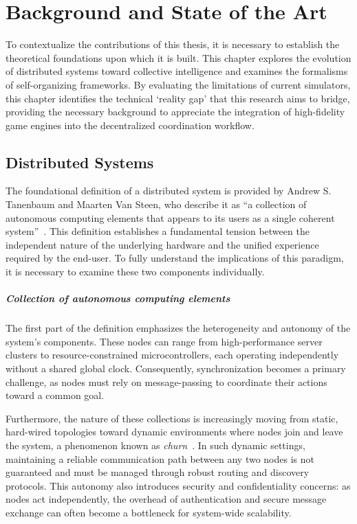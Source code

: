 \chapter{Background and State of the Art}

To contextualize the contributions of this thesis, it is necessary to establish the theoretical foundations upon which it is built. This chapter explores the evolution of distributed systems toward collective intelligence and examines the formalisms of self-organizing frameworks. By evaluating the limitations of current simulators, this chapter identifies the technical `reality gap' that this research aims to bridge, providing the necessary background to appreciate the integration of high-fidelity game engines into the decentralized coordination workflow.

\section{Distributed Systems}

The foundational definition of a distributed system is provided by Andrew S. Tanenbaum and Maarten Van Steen, who describe it as ``a collection of autonomous computing elements that appears to its users as a single coherent system''~\cite{Tanenbaum_Van_Steen_2001b}. This definition establishes a fundamental tension between the independent nature of the underlying hardware and the unified experience required by the end-user. To fully understand the implications of this paradigm, it is necessary to examine these two components individually.

\paragraph{Collection of autonomous computing elements}
The first part of the definition emphasizes the heterogeneity and autonomy of the system's components. These nodes can range from high-performance server clusters to resource-constrained microcontrollers, each operating independently without a shared global clock. Consequently, synchronization becomes a primary challenge, as nodes must rely on message-passing to coordinate their actions toward a common goal.

Furthermore, the nature of these collections is increasingly moving from static, hard-wired topologies toward dynamic environments where nodes join and leave the system, a phenomenon known as \emph{churn}~\cite{stutzbach2006understanding}. In such dynamic settings, maintaining a reliable communication path between any two nodes is not guaranteed and must be managed through robust routing and discovery protocols. This autonomy also introduces security and confidentiality concerns: as nodes act independently, the overhead of authentication and secure message exchange can often become a bottleneck for system-wide scalability.

